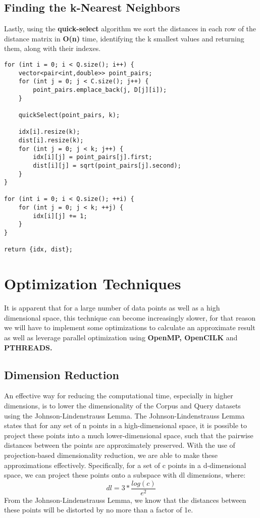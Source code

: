 \documentclass[12pt]{report}
\begin{document}
\section{Finding the k-Nearest Neighbors}
    Lastly, using the \textbf{quick-select} algorithm we sort the distances in each row of the distance matrix in \textbf{O(n)} time, identifying the k smallest values and returning them, along with their indexes.
\begin{lstlisting}[style=cppstyle]
for (int i = 0; i < Q.size(); i++) {
    vector<pair<int,double>> point_pairs;
    for (int j = 0; j < C.size(); j++) {
        point_pairs.emplace_back(j, D[j][i]);
    }
        
    quickSelect(point_pairs, k);
        
    idx[i].resize(k);
    dist[i].resize(k);
    for (int j = 0; j < k; j++) {
        idx[i][j] = point_pairs[j].first;
        dist[i][j] = sqrt(point_pairs[j].second);
    }
}

for (int i = 0; i < Q.size(); ++i) {
    for (int j = 0; j < k; ++j) {
        idx[i][j] += 1;
    }
}

return {idx, dist};
\end{lstlisting}

\chapter{Optimization Techniques}
It is apparent that for a large number of data points as well as a high dimensional space, this technique can become increasingly slower, for that reason we will have to implement some optimizations to calculate an approximate result as well as leverage parallel optimization using \textbf{OpenMP, OpenCILK} and \textbf{PTHREADS.}

\section{Dimension Reduction}
An effective way for reducing the computational time, especially in higher dimensions, is to lower the dimensionality of the Corpus and Query datasets using the Johnson-Lindenstrauss Lemma.
The Johnson-Lindenstrauss Lemma states that for any set of n points in a high-dimensional space, it is possible to project these points into a much lower-dimensional space, such that the pairwise distances between the points are approximately preserved. With the use of projection-based dimensionality reduction, we are able to make these approximations effectively. Specifically, for a set of c points in a d-dimensional space, we can project these points onto a subspace with dl dimensions, where:
\[
dl = 3*\frac{log(c)}{e^2}
\]
From the Johnson-Lindenstrauss Lemma, we know that the distances between these points will be distorted by no more than a factor of 1\pm e.
\end{document}
